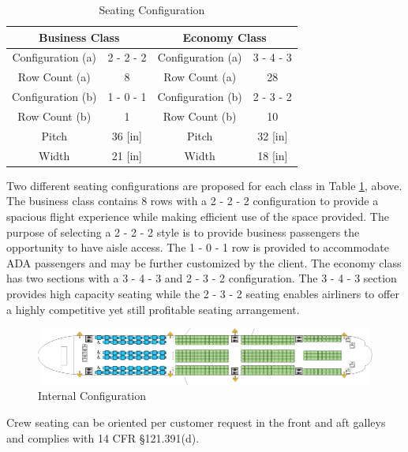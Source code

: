 \begin{table}[!h]
    \centering
    \caption{Seating Configuration}
    \begin{tabular}{|c|c||c|c|} \toprule
        \multicolumn{2}{c}{\textbf{Business Class}} & \multicolumn{2}{c}{\textbf{Economy Class}} \\ \hline
        Configuration (a) & 2 - 2 - 2 & Configuration (a) & 3 - 4 - 3 \\ \hline
        Row Count (a) & 8 & Row Count (a) & 28 \\ \hline
        Configuration (b) & 1 - 0 - 1 & Configuration (b) & 2 - 3 - 2 \\ \hline
        Row Count (b) & 1 & Row Count (b) & 10 \\ \hline
        Pitch & 36 [in] & Pitch & 32 [in] \\ \hline
        Width & 21 [in] & Width & 18 [in] \\ \bottomrule
    \end{tabular}
    \label{tab:seating}
\end{table}

Two different seating configurations are proposed for each class in Table \ref{tab:seating}, above.  The business class contains 8 rows with a 2 - 2 - 2 configuration to provide a spacious flight experience while making efficient use of the space provided.  The purpose of selecting a 2 - 2 - 2 style is to provide business passengers the opportunity to have aisle access.  The 1 - 0 - 1 row is provided to accommodate ADA passengers \cite{adaseating} and may be further customized by the client.  The economy class has two sections with a 3 - 4 - 3 and 2 - 3 - 2 configuration.  The 3 - 4 - 3 section provides high capacity seating while the 2 - 3 - 2 seating enables airliners to offer a highly competitive yet still profitable seating arrangement.

\begin{figure}[!h]
    \centering
    \includegraphics[width=\textwidth]{Photos/Config undimensioned.png}
    \caption{Internal Configuration}
    \label{fig:internalConfig}
\end{figure}

Crew seating can be oriented per customer request in the front and aft galleys and complies with 14 CFR \S 121.391(d).

